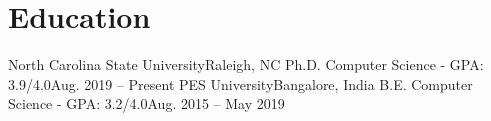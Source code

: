 \section{Education}
  \resumeSubHeadingListStart
    \resumeSubheading
      {North Carolina State University}{Raleigh, NC}
      {Ph.D. Computer Science - GPA: 3.9/4.0}{Aug. 2019 -- Present}
    \resumeSubheading
      {PES University}{Bangalore, India}
      {B.E. Computer Science - GPA: 3.2/4.0}{Aug. 2015 -- May 2019}
  \resumeSubHeadingListEnd